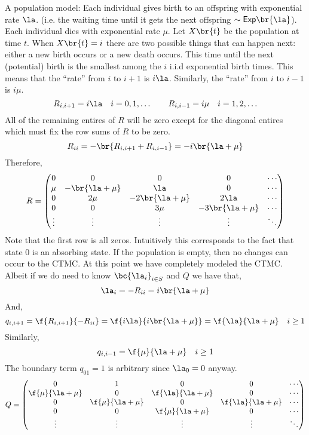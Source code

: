 \documentclass{article}
\newcommand{\Ex}{\mathsf{Exp}}
\begin{document}
    \begin{example}
        A population model: Each individual gives birth to an offspring with exponential rate $\la$. (i.e. the waiting time until it gets the next offspring $\sim \Ex\br{\la}$). Each individual dies with exponential rate $\mu$. Let $X\br{t}$ be the population at time $t$. When $X\br{t}= i$ there are two possible things that can happen next: either a new birth occurs or a new death occurs. This time until the next (potential) birth is the smallest among the $i$ i.i.d exponential birth times. This means that the ``rate'' from $i$ to $i + 1$ is $i \la$. Similarly, the ``rate'' from $i$ to $i-1$ is $i\mu$.
        \[ R_{i, i+1} = i \la \quad i = 0, 1, \ldots \qquad R_{i, i -1} = i \mu \quad i = 1, 2, \ldots\]
        All of the remaining entires of $R$ will be zero except for the diagonal entires which must fix the row sums of $R$ to be zero.
        \[ R_{ii} = - \br{R_{i, i+1} + R_{i, i-1}} = -i\br{\la + \mu} \]
        Therefore,
        \[ R = \begin{pmatrix}
            0 & 0 & 0 & 0 & \cdots \\
            \mu & -\br{\la+\mu} & \la & 0 & \cdots \\
            0 & 2\mu & -2\br{\la+\mu} & 2\la & \cdots \\
            0 & 0 & 3 \mu & -3\br{\la+\mu} & \cdots \\
            \vdots & \vdots & \vdots & \vdots & \ddots \\
        \end{pmatrix} \]
        Note that the first row is all zeros. Intuitively this corresponds to the fact that state $0$ is an absorbing state. If the population is empty, then no changes can occur to the CTMC. At this point we have completely modeled the CTMC. Albeit if we do need to know $\bc{\la_i}_{i \in S}$ and $Q$ we have that,
        \[ \la_i = - R_{ii} = i \br{\la + \mu} \]
        And,
        \[ q_{i, i+1} = \f{R_{i, i+1}}{- R_{ii}} = \f{i \la}{ i  \br{\la + \mu}} = \f{\la}{\la + \mu} \quad i \geq 1 \]
        Similarly,
        \[ q_{i, i-1} = \f{\mu}{\la + \mu} \quad i \geq 1 \]
        The boundary term $q_{01} = 1$ is arbitrary since $\la_0 = 0$ anyway.
        \[ Q = \begin{pmatrix}
            0 & 1 & 0 & 0 & \cdots \\
            \f{\mu}{\la + \mu} & 0 & \f{\la}{\la + \mu} & 0 & \cdots \\
            0 & \f{\mu}{\la + \mu} & 0 & \f{\la}{\la + \mu} & \cdots \\
            0 & 0 & \f{\mu}{\la + \mu} & 0 & \cdots \\
            \vdots & \vdots & \vdots & \vdots & \ddots \\
        \end{pmatrix} \]
    \end{example}
\end{document}
